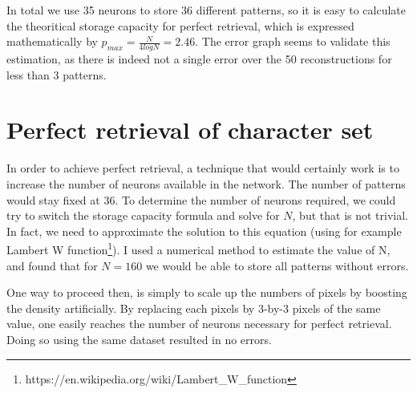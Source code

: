 \documentclass[11pt, a4paper]{article}
\begin{document}
In total we use 35 neurons to store 36 different patterns, so it is
easy to calculate the theoritical storage capacity for perfect
retrieval, which is expressed mathematically by
$p_{max}=\frac{N}{4logN}=2.46$. The error graph seems to validate this
estimation, as there is indeed not a single error over the 50
reconstructions for less than 3 patterns.

\section{Perfect retrieval of character set}

In order to achieve perfect retrieval, a technique that would
certainly work is to increase the number of neurons available in the
network. The number of patterns would stay fixed at 36. To determine
the number of neurons required, we could try to switch the storage
capacity formula and solve for $N$, but that is not trivial. In fact,
we need to approximate the solution to this equation (using for
example Lambert W
function\footnote{https://en.wikipedia.org/wiki/Lambert\_W\_function}). I
used a numerical method to estimate the value of N, and found that for
$N=160$ we would be able to store all patterns without errors.

One way to proceed then, is simply to scale up the numbers of pixels
by boosting the density artificially. By replacing each pixels by
3-by-3 pixels of the same value, one easily reaches the number of
neurons necessary for perfect retrieval. Doing so using the same
dataset resulted in no errors.
\end{document}
